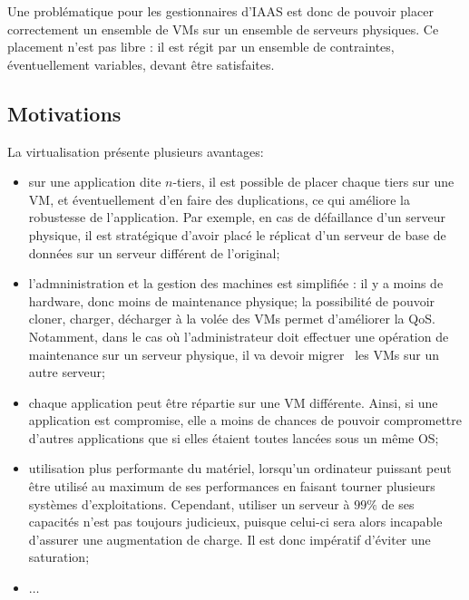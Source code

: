 \documentclass[a4paper]{article}
\begin{document}

Une problématique pour les gestionnaires d'IAAS est donc de pouvoir placer
correctement un ensemble de VMs sur un ensemble de serveurs physiques.
Ce placement n'est pas libre : il est régit par un ensemble de contraintes,
éventuellement variables, devant être satisfaites.

\subsection{Motivations}
La virtualisation présente plusieurs avantages:
\begin{itemize}
	\item sur une application dite $n$-tiers, il est possible
	de placer chaque tiers sur une VM, et éventuellement d'en faire
	des duplications, ce qui améliore la robustesse de l'application.
	Par exemple, en cas de défaillance d'un serveur physique, il est
	stratégique d'avoir placé le réplicat d'un serveur de base de
	données sur un serveur différent de l'original;
	\item l'admninistration et la gestion des machines est simplifiée :
	il y a moins de hardware, donc moins de maintenance physique;
	la possibilité de pouvoir cloner, charger, décharger à la volée des
	VMs permet d'améliorer la QoS. Notamment, dans le cas
	où l'administrateur doit effectuer une opération de maintenance sur
	un serveur physique, il va devoir migrer~\cite{clark2005live} les VMs
	sur un autre serveur;
	\item chaque application peut être répartie sur une VM différente.
	Ainsi, si une application est compromise, elle a moins de chances
	de pouvoir compromettre d'autres applications que si elles étaient
	toutes lancées sous un même OS;
	\item utilisation plus performante du matériel, lorsqu'un ordinateur
	puissant peut être utilisé au maximum de ses performances en faisant
	tourner plusieurs systèmes d'exploitations. Cependant, utiliser un
	serveur à $99\%$ de ses capacités n'est pas toujours judicieux, puisque celui-ci
	sera alors incapable d'assurer une augmentation de charge. Il est donc
	impératif d'éviter une saturation;
	\item $\ldots$
\end{itemize}
\end{document}

